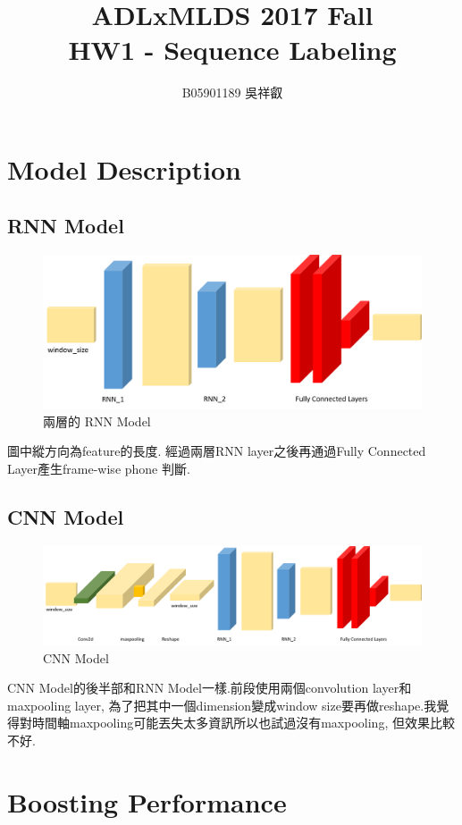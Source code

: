 \documentclass[12pt, a4paper]{article}
\title{ADLxMLDS 2017 Fall\\HW1 - Sequence Labeling}
\author{B05901189 吳祥叡}
\begin{document}
	{\let\newpage\relax\maketitle}
	\section{Model Description}
		\subsection{RNN Model}
			\begin{figure}[h]
				\includegraphics[width=\linewidth]{2LayerLSTM.png}
				\caption{兩層的 RNN Model}
			\end{figure}
			圖中縱方向為feature的長度.
			經過兩層RNN layer之後再通過Fully Connected Layer產生frame-wise phone 判斷.
		\subsection{CNN Model}		
			\begin{figure}[h!]
				\includegraphics[width=\linewidth]{CNN_model.png}
				\caption{CNN Model}
			\end{figure}
			CNN Model的後半部和RNN Model一樣.前段使用兩個convolution layer和maxpooling layer, 為了把其中一個dimension變成window size要再做reshape.我覺得對時間軸maxpooling可能丟失太多資訊所以也試過沒有maxpooling, 但效果比較不好.
	\section{Boosting Performance}
\end{document}
